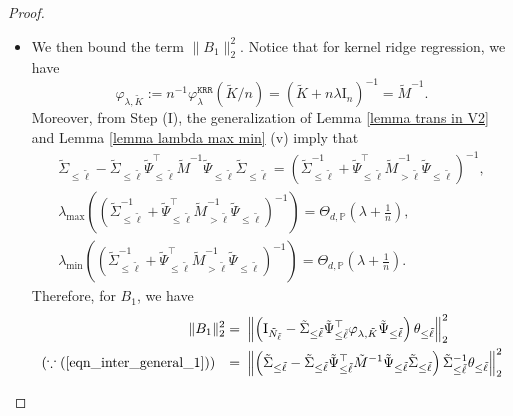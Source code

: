 \documentclass{article}
\theoremstyle{plain}
\theoremstyle{definition}
\theoremstyle{remark}
\newcommand{\reg}{\varphi_\lambda}
\newcommand*{\krr}{\mathtt{KRR}}
\begin{document}
\begin{appendix}
\begin{proof}
\begin{itemize}
    \item We then bound the term $\|B_1\|_2^2$. Notice that for kernel ridge regression, we have 
    \begin{equation}\label{eqn_inter_general_1}
        \varphi_{\lambda, \tilde{K}}:=n^{-1}\reg^{\krr}(\tilde{K}/n) = (\tilde{K} + n\lambda \mathrm{I}_n)^{-1} = \tilde{M}^{-1}.
    \end{equation}
    Moreover, from Step (I), the generalization of Lemma \ref{lemma trans in V2} and Lemma \ref{lemma lambda max min} (v) imply that
    \begin{align}
            \tilde{\Sigma}_{\leq \tilde{\ell}} - \tilde{\Sigma}_{\leq \tilde{\ell}} \tilde{\Psi}^{\top}_{\leq \tilde{\ell}} \tilde{M}^{-1} \tilde{\Psi}_{\leq \tilde{\ell}} \tilde{\Sigma}_{\leq \tilde{\ell}}
        =
            \left( \tilde{\Sigma}_{\leq \tilde{\ell}}^{-1} + \tilde{\Psi}_{\leq \tilde{\ell}}^{\top} \tilde{M}_{>\tilde{\ell}}^{-1} \tilde{\Psi}_{\leq \tilde{\ell}}  \right)^{-1}, \label{eqn_inter_general_2} \\[6pt]
         \lambda_{\text{max}} \left(  \left( \tilde{\Sigma}_{\leq \tilde{\ell}}^{-1} + \tilde{\Psi}_{\leq \tilde{\ell}}^{\top} \tilde{M}_{>\tilde{\ell}}^{-1} \tilde{\Psi}_{\leq \tilde{\ell}}  \right)^{-1} \right)
        = \Theta_{d, \mathbb{P}}\left(\lambda + \frac{1}{n}\right),
        \label{eqn_inter_general_3} \\[6pt]
        \lambda_{\text{min}} \left(  \left( \tilde{\Sigma}_{\leq \tilde{\ell}}^{-1} + \tilde{\Psi}_{\leq \tilde{\ell}}^{\top} \tilde{M}_{>\tilde{\ell}}^{-1} \tilde{\Psi}_{\leq \tilde{\ell}}  \right)^{-1} \right) = \Theta_{d, \mathbb{P}}\left(\lambda + \frac{1}{n}\right). \label{eqn_inter_general_4} 
    \end{align}
    Therefore, for $B_1$, we have
    \begin{equation*}
        \begin{aligned}
            \|B_1\|_{2}^{2} =&~ \left\| \left( \mathrm{I}_{\tilde{N}_{\tilde{\ell}}} - \tilde{\Sigma}_{\leq \tilde{\ell}} \tilde{\Psi}^{\top}_{\leq \tilde{\ell}} \varphi_{\lambda, \tilde{K}} \tilde{\Psi}_{\leq \tilde{\ell}}\right)    \theta_{\leq \tilde{\ell}} \right\|_{2}^{2}\\
           (\because (\ref{eqn_inter_general_1})) \quad {=}&~ \left\| \left( \tilde{\Sigma}_{\leq \tilde{\ell}} - \tilde{\Sigma}_{\leq \tilde{\ell}} \tilde{\Psi}^{\top}_{\leq \tilde{\ell}} \tilde{M}^{-1} \tilde{\Psi}_{\leq \tilde{\ell}} \tilde{\Sigma}_{\leq \tilde{\ell}} \right) \tilde{\Sigma}_{\leq \tilde{\ell}}^{-1}   \theta_{\leq \tilde{\ell}} \right\|_{2}^{2}\\

\end{aligned}
\end{equation*}
\end{itemize}
\end{proof}
\end{appendix}
\end{document}
